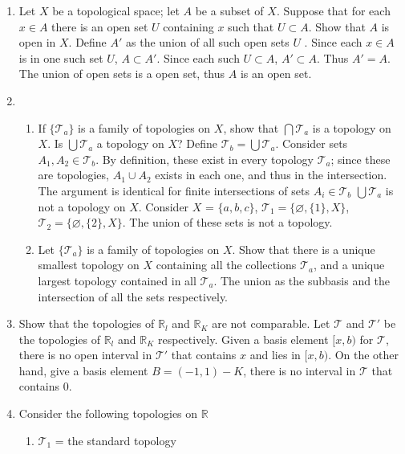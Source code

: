 \documentclass[12pt,letterpaper]{article}
\newcommand{\n}{\break}
\let\emptyset\varnothing
\newcommand{\T}{\ensuremath{\mathcal{T}}}
\begin{document}
\RaggedRight
\begin{enumerate}
\item Let $X$ be a topological space; let $A$ be a subset of $X$.
Suppose that for each $x\in A$ there is an open set $U$ containing $x$ such that $U \subset A$.
Show that $A$ is open in $X$. \n
\indent Define $A'$ as the union of all such open sets $U$ . Since each $x\in A$ is in one such set $U$, $A\subset A'$. Since each such $U \subset A$, $A' \subset A$. Thus $A'=A$.
The union of open sets is a open set, thus $A$ is an open set.
\addtocounter{enumi}{2}
\item 
  \begin{enumerate}
  \item If $\{\mathcal{T}_a\}$ is a family of topologies on $X$, show that $\bigcap \mathcal{T}_a$ is a topology on $X$.
    Is $\bigcup \mathcal{T}_a$ a topology on $X$?\n
    \indent Define $\mathcal{T}_b=\bigcup \mathcal{T}_a$. Consider sets $A_1,A_2\in \mathcal{T}_b$.
    By definition, these exist in every topology $\mathcal{T}_a$; since these are topologies, $A_1\cup A_2$ exists in each one, and thus in the intersection.
    The argument is identical for finite intersections of sets $A_i\in \mathcal{T}_b$ \n
    \indent $\bigcup \mathcal{T}_a$ is not a topology on $X$. Consider $X$ = $\{a,b,c\}$, $\mathcal{T}_1=\{\emptyset,\{1\},X\}$, $\mathcal{T}_2=\{\emptyset,\{2\},X\}$. The union of these sets is not a topology.
  \item Let $\{\mathcal{T}_a\}$ is a family of topologies on $X$. Show that there is a unique smallest topology on $X$ containing all the collections $\mathcal{T}_a$, and a unique largest topology contained in all $\mathcal{T}_a$.\n
    The union as the subbasis and the intersection of all the sets respectively.
  \addtocounter{enumii}{1}
  \end{enumerate}
  \addtocounter{enumi}{1}
\item Show that the topologies of $\mathbb{R}_l$ and $\mathbb{R}_K$ are not comparable. \n
  \indent Let $\mathcal{T}$ and $\mathcal{T}'$ be the topologies of $\mathbb{R}_l$ and $\mathbb{R}_K$ respectively.
  Given a basis element $[x,b)$ for $\T$, there is no open interval in $\T '$ that contains $x$ and lies in $[x,b)$.
  On the other hand, give a basis element $B = (-1, 1) - K$, there is no interval in $\T$ that contains 0.
\item Consider the following topologies on $\mathbb{R}$
  \begin{enumerate}
  \item[] $\T_1$ = the standard topology

\end{enumerate}
\end{enumerate}
\end{document}
